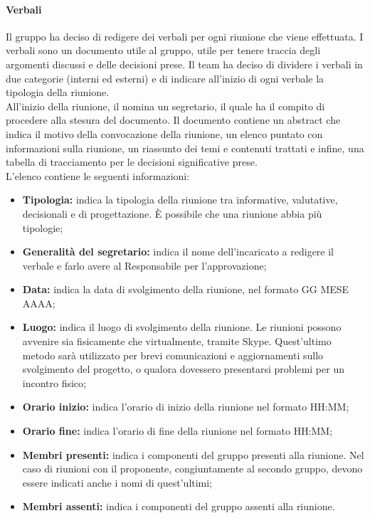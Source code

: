 			\paragraph{Verbali}
			Il gruppo ha deciso di redigere dei verbali per ogni riunione che viene effettuata. I verbali sono un documento utile al gruppo, utile per tenere traccia degli argomenti discussi e delle decisioni prese. Il team ha deciso di dividere i verbali in due categorie (interni ed esterni) e di indicare all'inizio di ogni verbale la tipologia della riunione.\\
			All'inizio della riunione, il \textit{\RdP} nomina un segretario, il quale ha il compito di procedere alla stesura del documento. Il documento contiene un abstract che indica il motivo della convocazione della riunione, un elenco puntato con informazioni sulla riunione, un riassunto dei temi e contenuti trattati e infine, una tabella di tracciamento per le decisioni significative prese.\\
			L'elenco contiene le seguenti informazioni:
			\begin{itemize}
				\item \textbf{Tipologia:} indica la tipologia della riunione tra informative, valutative, decisionali e di progettazione. \MakeUppercase{è} possibile che una riunione abbia più tipologie;
				\item \textbf{Generalità del segretario:} indica il nome dell'incaricato a redigere il verbale e farlo avere al Responsabile per l'approvazione;
				\item \textbf{Data:} indica la data di svolgimento della riunione, nel formato GG MESE AAAA;
				\item \textbf{Luogo:} indica il luogo di svolgimento della riunione. Le riunioni possono avvenire sia fisicamente che virtualmente, tramite Skype. Quest'ultimo metodo sarà utilizzato per brevi comunicazioni e aggiornamenti sullo svolgimento del progetto, o qualora dovessero presentarsi problemi per un incontro fisico;
				\item \textbf{Orario inizio:} indica l'orario di inizio della riunione nel formato HH:MM;
				\item \textbf{Orario fine:} indica l'orario di fine della riunione nel formato HH:MM;
				\item \textbf{Membri presenti:} indica i componenti del gruppo presenti alla riunione. Nel caso di riunioni con il proponente, congiuntamente al secondo gruppo, devono essere indicati anche i nomi di quest'ultimi;
				\item \textbf{Membri assenti:} indica i componenti del gruppo assenti alla riunione.
			\end{itemize}
